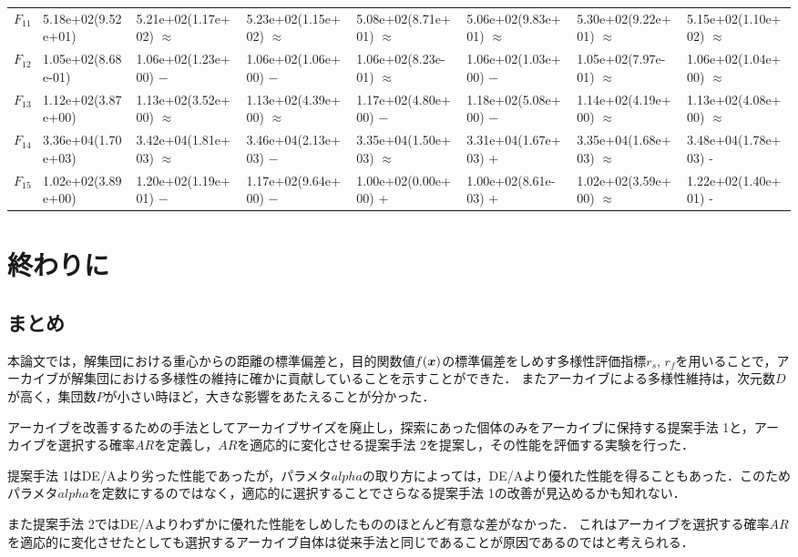 \documentclass[a4paper,11pt,oneside,openany]{jsbook}
\def\vector#1{\mbox{\boldmath $#1$}}
\begin{document}
\begin{landscape}
\begin{table}[!tbp]
\begin{center}
\begin{tabular}{llllllll}
$F_{11}$&5.18e+02(9.52e+01)&5.21e+02(1.17e+02) $\approx$&5.23e+02(1.15e+02) $\approx$&5.08e+02(8.71e+01) $\approx$&5.06e+02(9.83e+01) $\approx$&5.30e+02(9.22e+01) $\approx$&5.15e+02(1.10e+02) $\approx$\tabularnewline
$F_{12}$&1.05e+02(8.68e-01)&1.06e+02(1.23e+00) −&1.06e+02(1.06e+00) −&1.06e+02(8.23e-01) $\approx$&1.06e+02(1.03e+00) −&1.05e+02(7.97e-01) $\approx$&1.06e+02(1.04e+00) $\approx$\tabularnewline
$F_{13}$&1.12e+02(3.87e+00)&1.13e+02(3.52e+00) $\approx$&1.13e+02(4.39e+00) $\approx$&1.17e+02(4.80e+00) −&1.18e+02(5.08e+00) −&1.14e+02(4.19e+00) $\approx$&1.13e+02(4.08e+00) $\approx$\tabularnewline
$F_{14}$&3.36e+04(1.70e+03)&3.42e+04(1.81e+03) $\approx$&3.46e+04(2.13e+03) −&3.35e+04(1.50e+03) $\approx$&3.31e+04(1.67e+03) +&3.35e+04(1.68e+03) $\approx$&3.48e+04(1.78e+03) -\tabularnewline
$F_{15}$&1.02e+02(3.89e+00)&1.20e+02(1.19e+01) −&1.17e+02(9.64e+00) −&1.00e+02(0.00e+00) +&1.00e+02(8.61e-03) +&1.02e+02(3.59e+00) $\approx$&1.22e+02(1.40e+01) -\tabularnewline
\hline
\end{tabular}\end{center}

\end{table}
\end{landscape}


\chapter{終わりに}
\section{まとめ}
本論文では，解集団における重心からの距離の標準偏差と，目的関数値$f(\vector{x})$の標準偏差をしめす多様性評価指標$r_s$, $r_f$を用いることで，アーカイブが解集団における多様性の維持に確かに貢献していることを示すことができた．
またアーカイブによる多様性維持は，次元数$D$が高く，集団数$P$が小さい時ほど，大きな影響をあたえることが分かった．

アーカイブを改善するための手法としてアーカイブサイズを廃止し，探索にあった個体のみをアーカイブに保持する提案手法 1と，アーカイブを選択する確率$AR$を定義し，$AR$を適応的に変化させる提案手法 2を提案し，その性能を評価する実験を行った．

提案手法 1はDE/Aより劣った性能であったが，パラメタ$alpha$の取り方によっては，DE/Aより優れた性能を得ることもあった．このためパラメタ$alpha$を定数にするのではなく，適応的に選択することでさらなる提案手法 1の改善が見込めるかも知れない．

また提案手法 2ではDE/Aよりわずかに優れた性能をしめしたもののほとんど有意な差がなかった．
これはアーカイブを選択する確率$AR$を適応的に変化させたとしても選択するアーカイブ自体は従来手法と同じであることが原因であるのではと考えられる．
\end{document}

